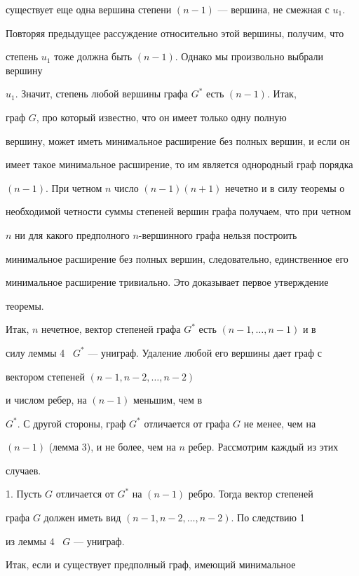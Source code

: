 \begin{pf}
существует еще одна вершина степени $(n-1)$ --- вершина, не смежная с $u_1$.


Повторяя предыдущее рассуждение относительно этой вершины, получим, что


степень $u_1$ тоже должна быть $(n-1)$. Однако мы произвольно выбрали вершину


$u_1$. Значит, степень любой вершины графа $G^*$ есть $(n-1)$. Итак,


граф $G$, про который известно, что он имеет только одну полную


вершину, может иметь минимальное расширение без полных вершин, и если он


имеет такое минимальное расширение, то им является однородный граф порядка


$(n-1)$. При четном $n$ число $(n-1)(n+1)$ нечетно и в силу теоремы о


необходимой четности суммы степеней вершин графа получаем, что при четном


$n$ ни для какого предполного $n$-вершинного графа нельзя построить


минимальное расширение без полных вершин, следовательно, единственное его


минимальное расширение тривиально. Это доказывает первое утверждение


теоремы.





Итак, $n$ нечетное, вектор степеней графа $G^*$ есть $(n-1,\dotsc,n-1)$ и в


силу леммы 4 \ $G^*$ --- униграф. Удаление любой его вершины дает граф с


вектором степеней $(n-1,n-2,\dotsc,n-2)$


и числом ребер, на $(n-1)$ меньшим, чем в


$G^*$. С другой стороны, граф $G^*$ отличается от графа $G$ не менее, чем на


$(n-1)$ (лемма 3), и не более, чем на $n$ ребер. Рассмотрим каждый из этих


случаев.





1. Пусть $G$ отличается от $G^*$ на $(n-1)$ ребро. Тогда вектор степеней


графа $G$ должен иметь вид $(n-1,n-2,\dotsc,n-2)$. По следствию 1


из леммы 4 \ $G$ --- униграф.


Итак, если и существует предполный граф, имеющий минимальное



\end{pf}
